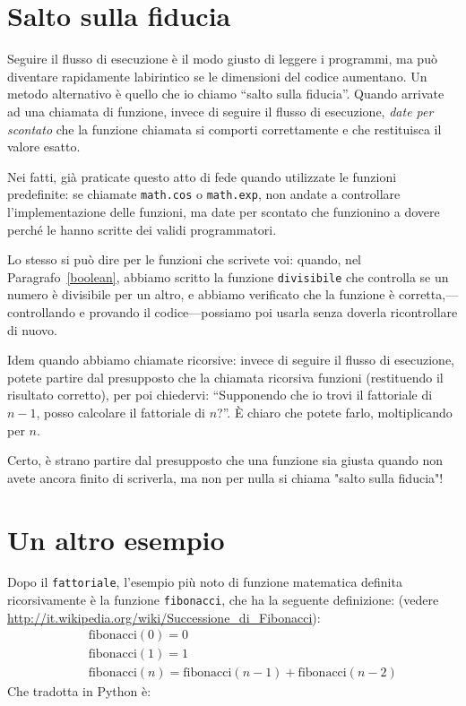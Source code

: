 \documentclass[10pt]{book}
\begin{document}
\section{Salto sulla fiducia}

Seguire il flusso di esecuzione è il modo giusto di leggere i programmi, ma
può diventare rapidamente labirintico se le dimensioni del codice aumentano. Un metodo alternativo è quello che io chiamo ``salto sulla fiducia''.  Quando arrivate ad una chiamata di funzione, invece di seguire il flusso di esecuzione, {\em date per scontato} che la funzione chiamata si comporti correttamente e   che restituisca il valore esatto.

Nei fatti, già praticate questo atto di fede quando utilizzate le funzioni predefinite: se chiamate {\tt math.cos} o {\tt math.exp}, non andate a controllare l'implementazione delle funzioni, ma date per scontato che funzionino a dovere perché le hanno scritte dei validi programmatori.

Lo stesso si può dire per le funzioni che scrivete voi: quando, nel Paragrafo~\ref{boolean}, abbiamo scritto la funzione
\verb"divisibile" che controlla se un numero è divisibile per un altro, e abbiamo verificato che la funzione è corretta,---controllando e provando il codice---possiamo poi usarla senza doverla ricontrollare di nuovo.

Idem quando abbiamo chiamate ricorsive: invece di seguire il flusso di esecuzione, potete partire dal presupposto che la chiamata ricorsiva funzioni
(restituendo il risultato corretto), per poi chiedervi: ``Supponendo che io trovi il fattoriale di $n-1$, posso calcolare il fattoriale di $n$?''. È chiaro che potete farlo, moltiplicando per $n$.

Certo, è strano partire dal presupposto che una funzione sia giusta quando non avete ancora finito di scriverla, ma non per nulla si chiama "salto sulla fiducia"!


\section{Un altro esempio}
\label{one.more.example}

Dopo il {\tt fattoriale}, l'esempio più noto di funzione matematica definita ricorsivamente è la funzione {\tt fibonacci}, che ha la seguente definizione: (vedere \url{http://it.wikipedia.org/wiki/Successione_di_Fibonacci}):
%
\begin{eqnarray*}
&& \mathrm{fibonacci}(0) = 0 \\
&& \mathrm{fibonacci}(1) = 1 \\
&& \mathrm{fibonacci}(n) = \mathrm{fibonacci}(n-1) + \mathrm{fibonacci}(n-2)
\end{eqnarray*}
%
Che tradotta in Python è:
\end{document}
